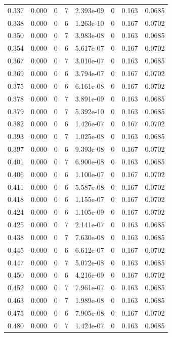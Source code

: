 \documentclass[preview]{standalone}
\begin{document}
{{{\begin{tabular}{L{1.2cm}C{1.2cm} C{0.3cm}C{0.5cm} C{1.4cm}C{1.4cm} C{1.4cm}C{1.4cm}}
  0.337  &  0.000  & 0     &  7 &  2.393e-09  & 0  & 0.163 &  0.0685   \\ 
  0.338  &  0.000  & 0     &  6 &  1.263e-10  & 0  & 0.167 &  0.0702   \\ 
  0.350  &  0.000  & 0     &  7 &  3.983e-08  & 0  & 0.163 &  0.0685   \\ 
  0.354  &  0.000  & 0     &  6 &  5.617e-07  & 0  & 0.167 &  0.0702   \\ 
  0.367  &  0.000  & 0     &  7 &  3.010e-07  & 0  & 0.163 &  0.0685   \\ 
  0.369  &  0.000  & 0     &  6 &  3.794e-07  & 0  & 0.167 &  0.0702   \\ 
  0.375  &  0.000  & 0     &  6 &  6.161e-08  & 0  & 0.167 &  0.0702   \\ 
  0.378  &  0.000  & 0     &  7 &  3.891e-09  & 0  & 0.163 &  0.0685   \\ 
  0.379  &  0.000  & 0     &  7 &  5.392e-10  & 0  & 0.163 &  0.0685   \\ 
  0.382  &  0.000  & 0     &  6 &  1.426e-07  & 0  & 0.167 &  0.0702   \\ 
  0.393  &  0.000  & 0     &  7 &  1.025e-08  & 0  & 0.163 &  0.0685   \\ 
  0.397  &  0.000  & 0     &  6 &  9.393e-08  & 0  & 0.167 &  0.0702   \\ 
  0.401  &  0.000  & 0     &  7 &  6.900e-08  & 0  & 0.163 &  0.0685   \\ 
  0.406  &  0.000  & 0     &  6 &  1.100e-07  & 0  & 0.167 &  0.0702   \\ 
  0.411  &  0.000  & 0     &  6 &  5.587e-08  & 0  & 0.167 &  0.0702   \\ 
  0.418  &  0.000  & 0     &  6 &  1.155e-07  & 0  & 0.167 &  0.0702   \\ 
  0.424  &  0.000  & 0     &  6 &  1.105e-09  & 0  & 0.167 &  0.0702   \\ 
  0.425  &  0.000  & 0     &  7 &  2.141e-07  & 0  & 0.163 &  0.0685   \\ 
  0.438  &  0.000  & 0     &  7 &  7.630e-08  & 0  & 0.163 &  0.0685   \\ 
  0.445  &  0.000  & 0     &  6 &  6.612e-07  & 0  & 0.167 &  0.0702   \\ 
  0.447  &  0.000  & 0     &  7 &  5.072e-08  & 0  & 0.163 &  0.0685   \\ 
  0.450  &  0.000  & 0     &  6 &  4.216e-09  & 0  & 0.167 &  0.0702   \\ 
  0.452  &  0.000  & 0     &  7 &  7.961e-07  & 0  & 0.163 &  0.0685   \\ 
  0.463  &  0.000  & 0     &  7 &  1.989e-08  & 0  & 0.163 &  0.0685   \\ 
  0.475  &  0.000  & 0     &  6 &  7.905e-08  & 0  & 0.167 &  0.0702   \\ 
  0.480  &  0.000  & 0     &  7 &  1.424e-07  & 0  & 0.163 &  0.0685   \\ 
\hline 
\end{tabular} 

}}}
\end{document}
